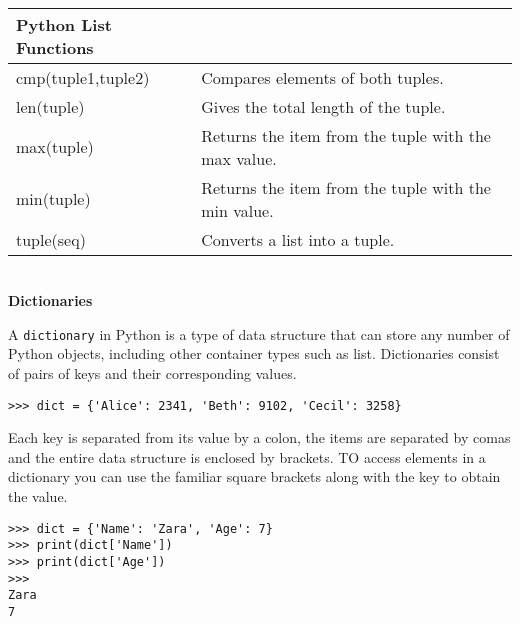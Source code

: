 \documentclass[letterpaper,11pt]{article}
\begin{document}
\\
\begin{tabular}[t]{l l}
    \textbf{Python List Functions}  \\
    \hline
    cmp(tuple1,tuple2) & Compares elements of both tuples.                   \\
    len(tuple)         & Gives the total length of the tuple.                \\
    max(tuple)         & Returns the item from the tuple with the max value. \\
    min(tuple)         & Returns the item from the tuple with the min value. \\
    tuple(seq)         & Converts a list into a tuple.                       \\
\end{tabular}
\\
\textbf{Dictionaries}
\par{A \texttt{dictionary} in Python is a type of data structure that can store
any number of Python objects, including other container types such as list.
Dictionaries consist of pairs of keys and their corresponding values.}
\\
\begin{minipage}{.5\textwidth}
    \begin{tcolorbox}
        \begin{footnotesize}
            \begin{verbatim}
>>> dict = {'Alice': 2341, 'Beth': 9102, 'Cecil': 3258}
            \end{verbatim}
        \end{footnotesize}
    \end{tcolorbox}
\end{minipage}
\par{Each key is separated from its value by a colon, the items are separated by
comas and the entire data structure is enclosed by brackets. TO access elements
in a dictionary you can use the familiar square brackets along with the key to
obtain the value.}
\\
\begin{minipage}{.5\textwidth}
    \begin{tcolorbox}
        \begin{footnotesize}
            \begin{verbatim}
>>> dict = {'Name': 'Zara', 'Age': 7}
>>> print(dict['Name'])
>>> print(dict['Age'])
>>>
Zara
7
            \end{verbatim}
        \end{footnotesize}
    \end{tcolorbox}
\end{minipage}
\end{document}
